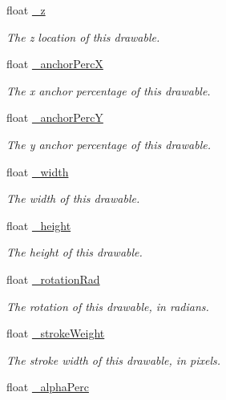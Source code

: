 \begin{DoxyCompactItemize}
float \hyperlink{classhype_1_1drawable_1_1_h_drawable_a3d0f13d023b008b211fdb60a87ade649}{\-\_\-z}
\begin{DoxyCompactList}\small\item\em The z location of this drawable. \end{DoxyCompactList}\item 
float \hyperlink{classhype_1_1drawable_1_1_h_drawable_a98b48c17667a22aaa8adfdedbd040661}{\-\_\-anchor\-Perc\-X}
\begin{DoxyCompactList}\small\item\em The x anchor percentage of this drawable. \end{DoxyCompactList}\item 
float \hyperlink{classhype_1_1drawable_1_1_h_drawable_a5b0e557854feedc7e19292bdb28c7739}{\-\_\-anchor\-Perc\-Y}
\begin{DoxyCompactList}\small\item\em The y anchor percentage of this drawable. \end{DoxyCompactList}\item 
float \hyperlink{classhype_1_1drawable_1_1_h_drawable_a3db419b74918a85aee0744fd18aad058}{\-\_\-width}
\begin{DoxyCompactList}\small\item\em The width of this drawable. \end{DoxyCompactList}\item 
float \hyperlink{classhype_1_1drawable_1_1_h_drawable_ad6213a21c5284ead8f127b1da90b9902}{\-\_\-height}
\begin{DoxyCompactList}\small\item\em The height of this drawable. \end{DoxyCompactList}\item 
float \hyperlink{classhype_1_1drawable_1_1_h_drawable_ae9b0ebe09024a9b3b41c8a94b97420af}{\-\_\-rotation\-Rad}
\begin{DoxyCompactList}\small\item\em The rotation of this drawable, in radians. \end{DoxyCompactList}\item 
float \hyperlink{classhype_1_1drawable_1_1_h_drawable_a2acc834533b5ca66f767d766fb6fed58}{\-\_\-stroke\-Weight}
\begin{DoxyCompactList}\small\item\em The stroke width of this drawable, in pixels. \end{DoxyCompactList}\item 
float \hyperlink{classhype_1_1drawable_1_1_h_drawable_a6c87f0a8619c53b4895ea14125ff8996}{\-\_\-alpha\-Perc}

\end{DoxyCompactItemize}
